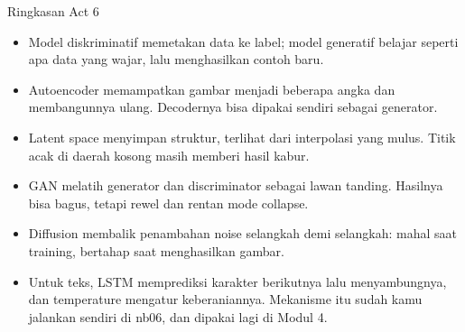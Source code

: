 \documentclass[aspectratio=169,t]{beamer}
\begin{document}
\begin{frame}{Ringkasan Act 6}
  \vspace{0.4em}
  \begin{itemize}\setlength\itemsep{0.3em}
    \item Model diskriminatif memetakan data ke label; model generatif belajar seperti apa data
          yang wajar, lalu menghasilkan contoh baru.
    \item Autoencoder memampatkan gambar menjadi beberapa angka dan membangunnya ulang.
          Decodernya bisa dipakai sendiri sebagai generator.
    \item Latent space menyimpan struktur, terlihat dari interpolasi yang mulus. Titik acak di
          daerah kosong masih memberi hasil kabur.
    \item GAN melatih generator dan discriminator sebagai lawan tanding. Hasilnya bisa bagus,
          tetapi rewel dan rentan mode collapse.
    \item Diffusion membalik penambahan noise selangkah demi selangkah: mahal saat training,
          bertahap saat menghasilkan gambar.
    \item Untuk teks, LSTM memprediksi karakter berikutnya lalu menyambungnya, dan temperature
          mengatur keberaniannya. Mekanisme itu sudah kamu jalankan sendiri di nb06, dan dipakai
          lagi di Modul 4.
  \end{itemize}
\end{frame}

\end{document}
